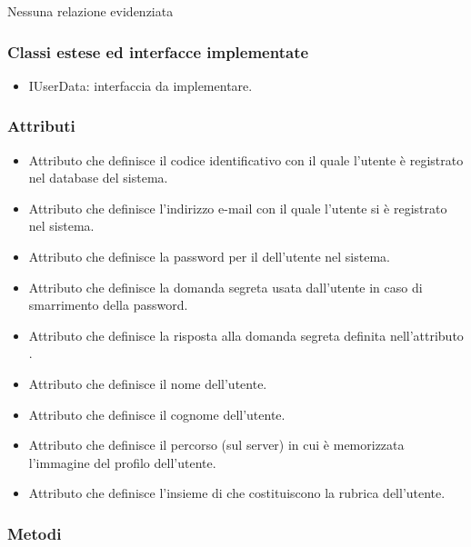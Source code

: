 Nessuna relazione evidenziata

\subsubsection*{Classi estese ed interfacce implementate}
\begin{itemize}
		\item{IUserData}: interfaccia da implementare.
\end{itemize}

\subsubsection*{Attributi}

\begin{itemize}
	\item{}
	Attributo che definisce il codice identificativo con il quale l'utente è registrato nel database del sistema.
	\item{}
	Attributo che definisce l'indirizzo e-mail con il quale l'utente si è registrato nel sistema.
	\item{}
	Attributo che definisce la password per il  dell'utente nel sistema.
	\item{}
	Attributo che definisce la domanda segreta usata dall'utente in caso di smarrimento della password.
	\item{}
	Attributo che definisce la risposta alla domanda segreta definita nell'attributo .
	\item{}
	Attributo che definisce il nome dell'utente.
	\item{}
	Attributo che definisce il cognome dell'utente.
	\item{}
	Attributo che definisce il percorso (sul server) in cui è memorizzata l'immagine del profilo dell'utente.
	\item{}
	Attributo che definisce l'insieme di  che costituiscono la rubrica dell'utente.
	
\end{itemize}

\subsubsection*{Metodi}

